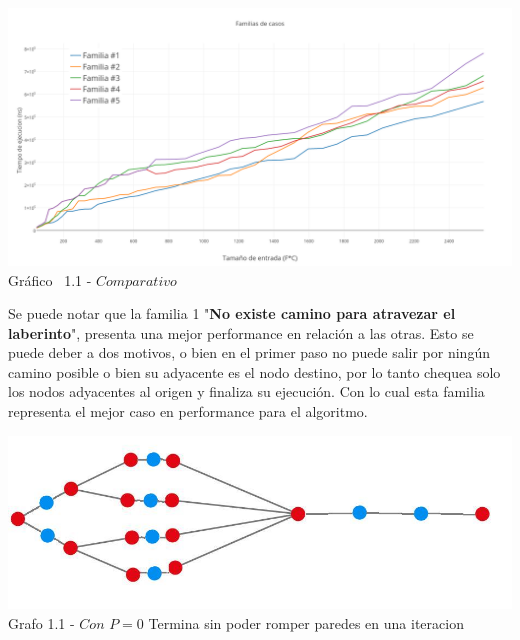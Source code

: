 \vspace*{0.3cm} \vspace*{0.3cm}
  \begin{center}
 \includegraphics[scale=0.4]{./EJ1/comparativo.png}
 {Gr\'afico \ 1.1 - $Comparativo$}
  \end{center}
  \vspace*{0.3cm}
  
Se puede notar que la familia 1 "\textbf{No existe camino para atravezar el laberinto}", presenta una mejor performance en relaci\'on a las otras. Esto se puede deber a dos motivos, o bien en el primer paso no puede salir por ning\'un camino posible o bien su adyacente es el nodo destino, por lo tanto chequea solo los nodos adyacentes al origen y finaliza su ejecuci\'on. Con lo cual esta familia representa el mejor caso en performance para el algoritmo.

\vspace*{0.3cm} \vspace*{0.3cm}
  \begin{center}
\includegraphics[scale=0.7]{./EJ1/ej1grafomejorcaso.jpeg}
{Grafo 1.1 - $Con$ $P=0$ Termina sin poder romper paredes en una iteracion}
  \end{center}
  \vspace*{0.3cm}

